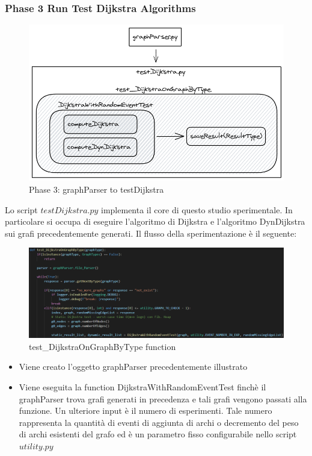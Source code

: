 \documentclass[a4paper]{article}
\begin{document}
\subsubsection{Phase 3 Run Test Dijkstra Algorithms}
\begin{figure}[!h]
\includegraphics[scale=0.43]{img/03_graphParser_to_testDijkstra}
\centering
\caption{Phase 3: graphParser to testDijkstra}
\end{figure}
Lo script $testDijkstra.py$ implementa il core di questo studio sperimentale. In particolare si occupa di eseguire l'algoritmo di Dijkstra e l'algoritmo DynDijkstra sui grafi precedentemente generati. Il flusso della sperimentazione è il seguente:
\begin{figure}[!h]
\includegraphics[scale=0.35]{img/test_DijkstraOnGraphByType}
\centering
\caption{test\_DijkstraOnGraphByType function}
\end{figure}
\begin{itemize}
\item Viene creato l'oggetto graphParser precedentemente illustrato
\item Viene eseguita la function DijkstraWithRandomEventTest finchè il graphParser trova grafi generati in precedenza e tali grafi vengono passati alla funzione. Un ulteriore input è il numero di esperimenti. Tale numero rappresenta la quantità di eventi di aggiunta di archi o decremento del peso di archi esistenti del grafo ed è un parametro fisso configurabile nello script $utility.py$
\end{itemize}
\end{document}
